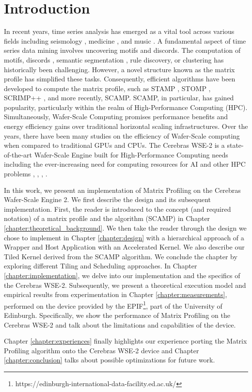 
\chapter{Introduction}\label{chapter:introduction}

In recent years, time series analysis has emerged as a vital tool across various fields including seismology \cite{10.1093/gji/ggy100}, medicine \cite{Fox_2017}, and music \cite{Silva2016SiMPleAM}. A fundamental aspect of time series data mining involves uncovering motifs and discords. The computation of motifs, discords \cite{1}, semantic segmentation \cite{8215484}, rule discovery, or clustering has historically been challenging. However, a novel structure known as the matrix profile has simplified these tasks. Consequently, efficient algorithms have been developed to compute the matrix profile, such as STAMP \cite{1}, STOMP \cite{2}, SCRIMP++ \cite{8594908}, and more recently, SCAMP\cite{4}. SCAMP, in particular, has gained popularity, particularly within the realm of High-Performance Computing (HPC). Simultaneously, Wafer-Scale Computing promises performance benefits and energy efficiency gains over traditional horizontal scaling infrastructures. Over the years, there have been many studies on the efficiency of Wafer-Scale computing \cite{10460211} when compared to traditional GPUs and CPUs. The Cerebras WSE-2 is a state-of-the-art Wafer-Scale Engine built for High-Performance Computing needs including the ever-increasing need for computing resources for AI and other HPC problems \cite{257870}, \cite{6}, \cite{3}, \cite{5}.

In this work, we present an implementation of Matrix Profiling on the Cerebras Wafer-Scale Engine 2. We first describe the design and its subsequent implementation. First, the reader is introduced to the concept (and required notation) of a matrix profile and the algorithm (SCAMP) in Chapter \ref{chapter:theoretical_background}. We then take the reader through the design we chose to implement in Chapter \ref{chapter:design} with a hierarchical approach of a Wrapper and Host Application with an Accelerated Kernel. We also describe our Tiled Kernel derived from the SCAMP algorithm. We conclude the chapter by exploring different Tiling and Scheduling approaches. In Chapter \ref{chapter:implementation}, we delve into our implementation and the specifics of the Cerebras WSE-2. Subsequently, we present a theoretical execution model and empirical results from experimentation in Chapter \ref{chapter:measurements}, performed on the device provided by the EPIF\footnote{https://edinburgh-international-data-facility.ed.ac.uk/}, part of the University of Edinburgh. Specifically, we show the performance of Matrix Profiling on the Cerebras WSE-2 and talk about the limitations and capabilities of the device.

Chapter \ref{chapter:experiences} finally highlights our experience porting the Matrix Profiling algorithm onto the Cerebras WSE-2 device and Chapter \ref{chapter:conclusion} talks about possible optimizations for future work. 
